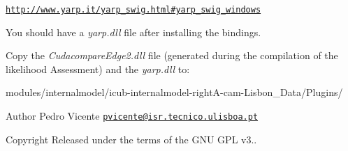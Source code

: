 \href{http://www.yarp.it/yarp_swig.html#yarp_swig_windows}{\tt http\+://www.\+yarp.\+it/yarp\+\_\+swig.\+html\#yarp\+\_\+swig\+\_\+windows}

You should have a {\itshape yarp.\+dll} file after installing the bindings.

Copy the {\itshape Cudacompare\+Edge2.\+dll} file (generated during the compilation of the likelihood Assessment) and the {\itshape yarp.\+dll} to\+: 
\begin{DoxyCode}
modules/internalmodel/icub-internalmodel-rightA-cam-Lisbon\_Data/Plugins/ 
\end{DoxyCode}


\begin{DoxyAuthor}{Author}
Pedro Vicente \href{mailto:pvicente@isr.tecnico.ulisboa.pt}{\tt pvicente@isr.\+tecnico.\+ulisboa.\+pt} ~\newline

\end{DoxyAuthor}
\begin{DoxyCopyright}{Copyright}
Released under the terms of the G\+NU G\+PL v3.. 
\end{DoxyCopyright}
